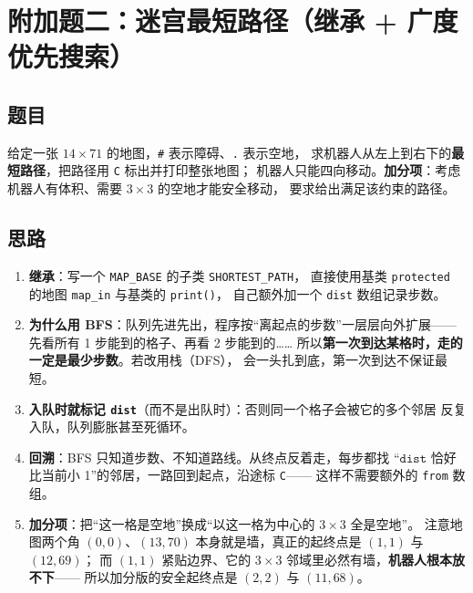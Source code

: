 \section{附加题二：迷宫最短路径（继承 + 广度优先搜索）}
\label{sec:navigate}

\subsection{题目}
给定一张 $14\times 71$ 的地图，\texttt{\#} 表示障碍、\texttt{.} 表示空地，
求机器人从左上到右下的\textbf{最短路径}，把路径用 \texttt{C} 标出并打印整张地图；
机器人只能四向移动。\textbf{加分项}：考虑机器人有体积、需要 $3\times3$ 的空地才能安全移动，
要求给出满足该约束的路径。

\subsection{思路}
\begin{enumerate}
  \item \textbf{继承}：写一个 \texttt{MAP\_BASE} 的子类 \texttt{SHORTEST\_PATH}，
        直接使用基类 \texttt{protected} 的地图 \texttt{map\_in} 与基类的 \texttt{print()}，
        自己额外加一个 \texttt{dist} 数组记录步数。
  \item \textbf{为什么用 BFS}：队列先进先出，程序按“离起点的步数”一层层向外扩展——
        先看所有 1 步能到的格子、再看 2 步能到的……
        所以\textbf{第一次到达某格时，走的一定是最少步数}。若改用栈（DFS），
        会一头扎到底，第一次到达不保证最短。
  \item \textbf{入队时就标记 \texttt{dist}}（而不是出队时）：否则同一个格子会被它的多个邻居
        反复入队，队列膨胀甚至死循环。
  \item \textbf{回溯}：BFS 只知道步数、不知道路线。从终点反着走，每步都找
        “$\texttt{dist}$ 恰好比当前小 1”的邻居，一路回到起点，沿途标 \texttt{C}——
        这样不需要额外的 \texttt{from} 数组。
  \item \textbf{加分项}：把“这一格是空地”换成“以这一格为中心的 $3\times3$ 全是空地”。
        注意地图两个角 $(0,0)$、$(13,70)$ 本身就是墙，真正的起终点是 $(1,1)$ 与 $(12,69)$；
        而 $(1,1)$ 紧贴边界、它的 $3\times3$ 邻域里必然有墙，\textbf{机器人根本放不下}——
        所以加分版的安全起终点是 $(2,2)$ 与 $(11,68)$。
\end{enumerate}

